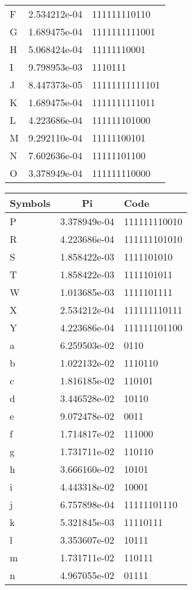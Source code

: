 \documentclass[12pt]{article} %
\numberwithin{equation}{section}
\begin{document}
\begin{table}[!hptb]
\begin{minipage}{.5\linewidth}
\begin{tabular}{lcl}
F 		 &2.534212e-04 		 &111111110110\\
G 		 &1.689475e-04 		 &1111111111001\\
H 		 &5.068424e-04 		 &11111110001\\
I 		 &9.798953e-03 		 &1110111\\
J 		 &8.447373e-05 		 &11111111111101\\
K 		 &1.689475e-04 		 &1111111111011\\
L 		 &4.223686e-04 		 &111111101000\\
M 		 &9.292110e-04 		 &11111100101\\
N 		 &7.602636e-04 		 &11111101100\\
O 		 &3.378949e-04 		 &111111110000\\ \hline
\end{tabular}
\end{minipage}\begin{minipage}{.5\linewidth}
\centering
\begin{tabular}{lcl}
\hline
Symbols  &Pi 				 &Code \\     \hline
P 		 &3.378949e-04 		 &111111110010\\
R 		 &4.223686e-04 		 &111111101010\\
S 		 &1.858422e-03 		 &1111101010\\
T 		 &1.858422e-03 		 &1111101011\\
W 		 &1.013685e-03 		 &1111101111\\
X 		 &2.534212e-04 		 &111111110111\\
Y 		 &4.223686e-04 		 &111111101100\\
a 		 &6.259503e-02 		 &0110\\
b 		 &1.022132e-02 		 &1110110\\
c 		 &1.816185e-02 		 &110101\\
d 		 &3.446528e-02 		 &10110\\
e 		 &9.072478e-02 		 &0011\\
f 		 &1.714817e-02 		 &111000\\
g 		 &1.731711e-02 		 &110110\\
h 		 &3.666160e-02 		 &10101\\
i 		 &4.443318e-02 		 &10001\\
j 		 &6.757898e-04 		 &11111101110\\
k 		 &5.321845e-03 		 &11110111\\
l 		 &3.353607e-02 		 &10111\\
m 		 &1.731711e-02 		 &110111\\
n 		 &4.967055e-02 		 &01111\\

\end{tabular}
\end{minipage}
\end{table}
\end{document}
